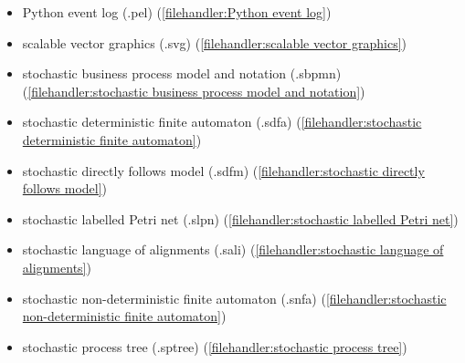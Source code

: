 {\begin{itemize}
\item Python event log (.pel) (\cref{filehandler:Python event log})
\item scalable vector graphics (.svg) (\cref{filehandler:scalable vector graphics})
\item stochastic business process model and notation (.sbpmn) (\cref{filehandler:stochastic business process model and notation})
\item stochastic deterministic finite automaton (.sdfa) (\cref{filehandler:stochastic deterministic finite automaton})
\item stochastic directly follows model (.sdfm) (\cref{filehandler:stochastic directly follows model})
\item stochastic labelled Petri net (.slpn) (\cref{filehandler:stochastic labelled Petri net})
\item stochastic language of alignments (.sali) (\cref{filehandler:stochastic language of alignments})
\item stochastic non-deterministic finite automaton (.snfa) (\cref{filehandler:stochastic non-deterministic finite automaton})
\item stochastic process tree (.sptree) (\cref{filehandler:stochastic process tree})
\end{itemize}}
